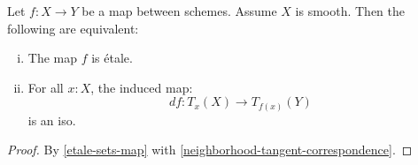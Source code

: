 \begin{corollary}
Let $f:X\to Y$ be a map between schemes. Assume $X$ is smooth. Then the following are equivalent:
\begin{enumerate}[(i)]
\item The map $f$ is étale. 
\item For all $x:X$, the induced map:
\[df : T_x(X)\to T_{f(x)}(Y)\]
is an iso.
\end{enumerate}
\end{corollary}

\begin{proof}
By \cref{etale-sets-map}  with \cref{neighborhood-tangent-correspondence}.
\end{proof}

